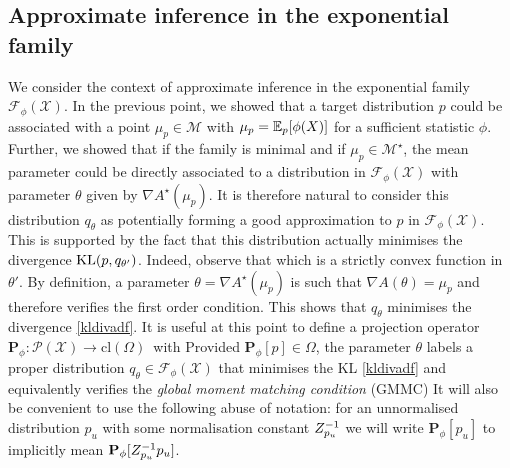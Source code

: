 \subsection{Approximate inference in the exponential family}
%
We consider the context of approximate inference in the exponential family $\mathcal F_{\phi}(\mathcal X)$. In the previous point, we showed that a target distribution $p$ could be associated with a point $\mu_p\in\mathcal M$ with $\mu_p=\mathbb E_{p}[\phi(X)]$ for a sufficient statistic $\phi$. Further, we showed that if the family is minimal and if $\mu_p\in\mathcal M^{\star}$, the mean parameter could be directly associated to a distribution in $\mathcal F_{\phi}(\mathcal X)$ with parameter $\theta$ given by $\nabla A^{\star}(\mu_p)$. It is therefore natural to consider this distribution $q_{\theta}$ as potentially forming a good approximation to $p$ in $\mathcal F_{\phi}(\mathcal X)$.
%
This is supported by the fact that this distribution actually minimises the divergence $\mathrm{KL}\!\left(p,q_{\theta'}\right)$. Indeed, observe that
%
%
which is a strictly convex function in $\theta'$. By definition, a parameter $\theta=\nabla A^{\star}(\mu_p)$ is such that $\nabla A(\theta)=\mu_p$ and therefore verifies the first order condition. This shows that $q_{\theta}$ minimises the divergence \eqref{kldivadf}. It is useful at this point to define a projection operator $\mathbf P_{\phi}:\mathcal P(\mathcal X) \to \mathrm{cl}(\Omega)$\, with
%
%
Provided $\mathbf P_{\phi}[p] \in \Omega$, the parameter $\theta$ labels a proper distribution $q_{\theta}\in\mathcal F_{\phi}(\mathcal X)$ that minimises the KL \eqref{kldivadf} and equivalently verifies the \emph{global moment matching condition} (GMMC) 
%
%
It will also be convenient to use the following abuse of notation: for an unnormalised distribution $p_{u}$ with some normalisation constant $Z_{p_{u}}^{-1}$ we will write $\mathbf P_{\phi}[p_{u}]$ to implicitly mean $\mathbf P_{\phi}[Z_{p_{u}}^{-1} p_{u}]$.

